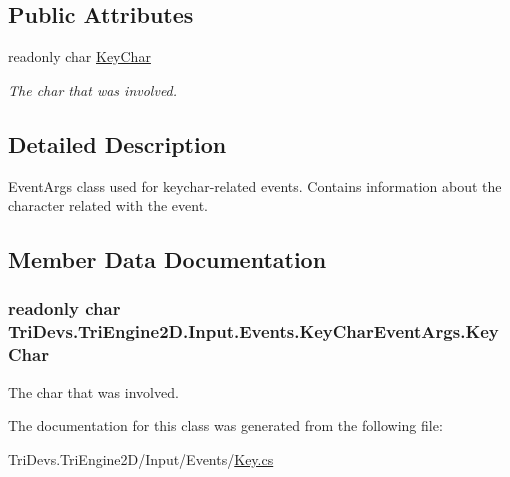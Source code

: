 \subsection*{Public Attributes}
\begin{DoxyCompactItemize}
\item 
readonly char \hyperlink{class_tri_devs_1_1_tri_engine2_d_1_1_input_1_1_events_1_1_key_char_event_args_aafff1e127540016e5a445eec7cd00468}{Key\-Char}
\begin{DoxyCompactList}\small\item\em The char that was involved. \end{DoxyCompactList}\end{DoxyCompactItemize}


\subsection{Detailed Description}
Event\-Args class used for keychar-\/related events. Contains information about the character related with the event. 



\subsection{Member Data Documentation}
\hypertarget{class_tri_devs_1_1_tri_engine2_d_1_1_input_1_1_events_1_1_key_char_event_args_aafff1e127540016e5a445eec7cd00468}{
\subsubsection[{Key\-Char}]{\setlength{\rightskip}{0pt plus 5cm}readonly char Tri\-Devs.\-Tri\-Engine2\-D.\-Input.\-Events.\-Key\-Char\-Event\-Args.\-Key\-Char}}\label{class_tri_devs_1_1_tri_engine2_d_1_1_input_1_1_events_1_1_key_char_event_args_aafff1e127540016e5a445eec7cd00468}


The char that was involved. 



The documentation for this class was generated from the following file\-:\begin{DoxyCompactItemize}
\item 
Tri\-Devs.\-Tri\-Engine2\-D/\-Input/\-Events/\hyperlink{_key_8cs}{Key.\-cs}\end{DoxyCompactItemize}

